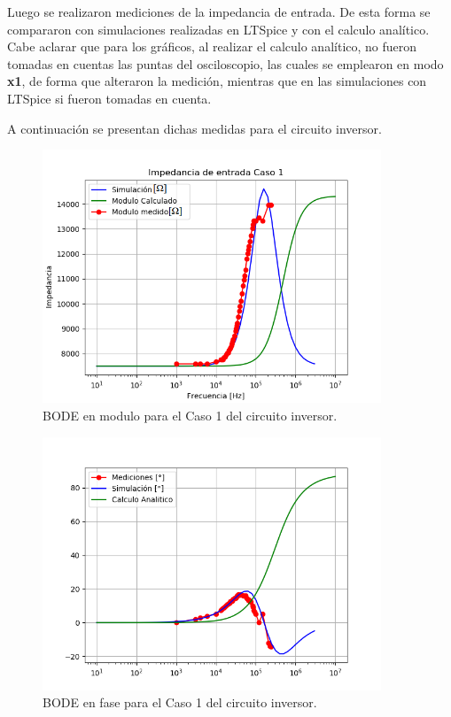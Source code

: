 Luego se realizaron mediciones de la impedancia de entrada. De esta forma se compararon con simulaciones realizadas en LTSpice y con el calculo analítico. Cabe aclarar que para los gráficos, al realizar el calculo analítico, no fueron tomadas en cuentas las puntas del osciloscopio, las cuales se emplearon en modo \textbf{x1}, de forma que alteraron la medición, mientras que en las simulaciones con LTSpice si fueron tomadas en cuenta.

A continuación se presentan dichas medidas para el circuito inversor.

\begin{figure}[H]	
	\centering
	\includegraphics[width=0.9\textwidth]{Ejercicio1/Imagenes/ZinC1.png}
	\caption{BODE en modulo para el Caso 1 del circuito inversor.}
	\label{fig:CompZinC1inv}
\end{figure} 

\begin{figure}[H]	
	\centering
	\includegraphics[width=0.9\textwidth]{Ejercicio1/Imagenes/ZinphC1.png}
	\caption{BODE en fase para el Caso 1 del circuito inversor.}
	\label{fig:CompZinphC1inv}
\end{figure} 

